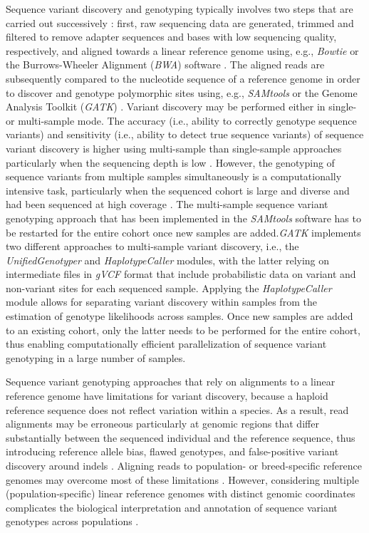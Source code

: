 \documentclass[../main.tex]{subfiles}
\begin{document}
Sequence variant discovery and genotyping typically involves two steps that are carried out successively \citep{nielsen2011genotype,guo2014three,goodwin2016coming,pfeifer2017next}: first, raw sequencing data are generated, trimmed and filtered to remove adapter sequences and bases with low sequencing quality, respectively, and aligned towards a linear reference genome using, e.g., \emph{Bowtie} \citep{langmead2012fast} or the Burrows-Wheeler Alignment (\emph{BWA}) software \citep{li2009fast}. The aligned reads are subsequently compared to the nucleotide sequence of a reference genome in order to discover and genotype polymorphic sites using, e.g., \emph{SAMtools} \citep{li2009sequence} or the Genome Analysis Toolkit (\emph{GATK}) \citep{mckenna2010genome,van2013fastq,poplin2018scaling}. Variant discovery may be performed either in single- or multi-sample mode. The accuracy (i.e., ability to correctly genotype sequence variants) and sensitivity (i.e., ability to detect true sequence variants) of sequence variant discovery is higher using multi-sample than single-sample approaches particularly when the sequencing depth is low \citep{liu2013variant,cheng2014assessing,baes2014evaluation,kumar2014evaluation,depristo2011framework}. However, the genotyping of sequence variants from multiple samples simultaneously is a computationally intensive task, particularly when the sequenced cohort is large and diverse and had been sequenced at high coverage \citep{poplin2018scaling}. The multi-sample sequence variant genotyping approach that has been implemented in the \emph{SAMtools} software has to be restarted for the entire cohort once new samples are added.\emph{GATK} implements two different approaches to multi-sample variant discovery, i.e., the \emph{UnifiedGenotyper} and \emph{HaplotypeCaller} modules, with the latter relying on intermediate files in \emph{gVCF} format that include probabilistic data on variant and non-variant sites for each sequenced sample. Applying the \emph{HaplotypeCaller} module allows for separating variant discovery within samples from the estimation of genotype likelihoods across samples. Once new samples are added to an existing cohort, only the latter needs to be performed for the entire cohort, thus enabling computationally efficient parallelization of sequence variant genotyping in a large number of samples.  

Sequence variant genotyping approaches that rely on alignments to a linear reference genome have limitations for variant discovery, because a haploid reference sequence does not reflect variation within a species. As a result, read alignments may be erroneous particularly at genomic regions that differ substantially between the sequenced individual and the reference sequence, thus introducing reference allele bias, flawed genotypes, and false-positive variant discovery around indels \citep{degner2009effect,Brandt931,Dilthey2015}. Aligning reads to population- or breed-specific reference genomes may overcome most of these limitations \citep{Fakhro2016,Shi2016,Ameur2018}. However, considering multiple (population-specific) linear reference genomes with distinct genomic coordinates complicates the biological interpretation and annotation of sequence variant genotypes across populations \citep{rakocevic2019fast}.
\end{document}

